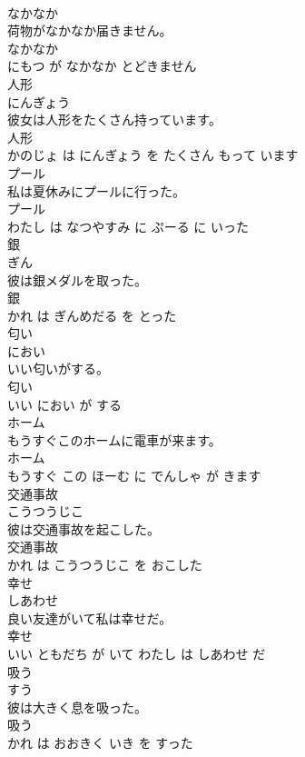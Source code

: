\documentclass[8pt]{extreport}
\begin{document}
\begin{CJK}{UTF8}{min}
\\	なかなか	
\\	荷物がなかなか届きません。	
\\	なかなか 
\\	にもつ が なかなか とどきません			
\\	人形	
\\	にんぎょう			
\\	彼女は人形をたくさん持っています。	
\\	人形 
\\	かのじょ は にんぎょう を たくさん もって います			
\\	プール	
\\	私は夏休みにプールに行った。	
\\	プール 
\\	わたし は なつやすみ に ぷーる に いった			
\\	銀	
\\	ぎん			
\\	彼は銀メダルを取った。	
\\	銀 
\\	かれ は ぎんめだる を とった			
\\	匂い	
\\	におい			
\\	いい匂いがする。	
\\	匂い 
\\	いい におい が する			
\\	ホーム	
\\	もうすぐこのホームに電車が来ます。	
\\	ホーム 
\\	もうすぐ この ほーむ に でんしゃ が きます			
\\	交通事故	
\\	こうつうじこ			
\\	彼は交通事故を起こした。	
\\	交通事故 
\\	かれ は こうつうじこ を おこした			
\\	幸せ	
\\	しあわせ			
\\	良い友達がいて私は幸せだ。	
\\	幸せ 
\\	いい ともだち が いて わたし は しあわせ だ			
\\	吸う	
\\	すう			
\\	彼は大きく息を吸った。	
\\	吸う 
\\	かれ は おおきく いき を すった			

\end{CJK}
\end{document}
